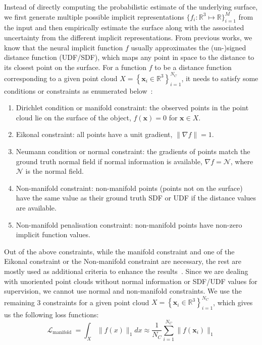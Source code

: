 Instead of directly computing the probabilistic estimate of the underlying surface, we first generate multiple possible implicit representations $\{f_i: \mathbb{R}^3 \mapsto \mathbb{R}\}_{i=1}^M$ from the input and then empirically estimate the surface along with the associated uncertainty from the different implicit representations. From previous works, we know that the neural implicit function $f$ usually approximates the (un-)signed distance function (UDF/SDF), which maps any point in space to the distance to its closest point on the surface. For a function $f$ to be a distance function corresponding to a given point cloud $X=\left\{\mathbf{x}_{i} \in \mathbb{R}^{3}\right\}_{i=1}^{N_C}$, it needs to satisfy some conditions or constraints as enumerated below~\cite{DiGS, NeuralHessian}:
\begin{enumerate}
    \item Dirichlet condition or manifold constraint: the observed points in the point cloud lie on the surface of the object, $f(\mathbf{x})=0$ for $\mathbf{x} \in X$.
    \item Eikonal constraint: all points have a unit gradient, $\|\nabla f\|=1$.
    \item Neumann condition or normal constraint:  the gradients of points match the ground truth normal field if normal information is available, $\nabla f=\mathcal{N}$, where $\mathcal{N}$ is the normal field.
    \item Non-manifold constraint: non-manifold points (points not on the surface) have the same value as their ground truth SDF or UDF if the distance values are available.
    \item Non-manifold penalisation constraint: non-manifold points have non-zero implicit function values.
\end{enumerate}
Out of the above constraints, while the manifold constraint and one of the Eikonal constraint or the Non-manifold constraint are necessary, the rest are mostly used as additional criteria to enhance the results~\cite{DiGS}. Since we are dealing with unoriented point clouds without normal information or SDF/UDF values for supervision, we cannot use normal and non-manifold constraints. We use the remaining 3 constraints for a given point cloud $X=\left\{\mathbf{x}_{i} \in \mathbb{R}^{3}\right\}_{i=1}^{N_C}$, which gives us the following loss functions:
\begin{equation}\label{manifold_sdf}
    \mathcal{L}_{\text {manifold }}=\int_{X}\|f(x)\|_{1} d x \approx \frac{1}{N_C}\sum_{i=1}^{N_C}\|f(\mathbf{x}_i)\|_1
\end{equation}
